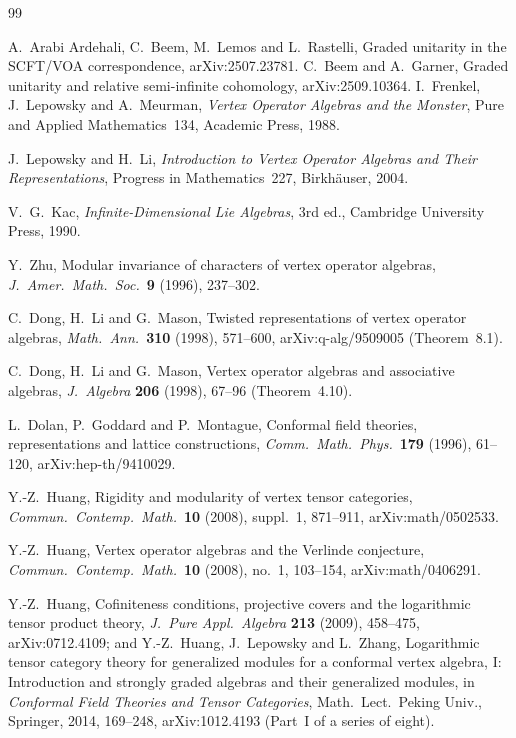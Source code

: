 \documentclass[10pt]{article}
\begin{document}
\begin{thebibliography}{99}\footnotesize

  A.~Arabi Ardehali, C.~Beem, M.~Lemos and L.~Rastelli, Graded unitarity in the SCFT/VOA correspondence,
  arXiv:2507.23781.
  C.~Beem and A.~Garner, Graded unitarity and relative semi-infinite cohomology, arXiv:2509.10364.
  I.~Frenkel, J.~Lepowsky and A.~Meurman, \emph{Vertex Operator Algebras and the Monster}, Pure and Applied
  Mathematics~134, Academic Press, 1988.

  J.~Lepowsky and H.~Li, \emph{Introduction to Vertex Operator Algebras and Their Representations}, Progress in
  Mathematics~227, Birkh\"auser, 2004.

  V.~G.~Kac, \emph{Infinite-Dimensional Lie Algebras}, 3rd ed., Cambridge University Press, 1990.

  Y.~Zhu, Modular invariance of characters of vertex operator algebras, \emph{J.\ Amer.\ Math.\ Soc.}\ \textbf{9}
  (1996), 237--302.

  C.~Dong, H.~Li and G.~Mason, Twisted representations of vertex operator algebras, \emph{Math.\ Ann.}\ \textbf{310}
  (1998), 571--600, arXiv:q-alg/9509005 (Theorem~8.1).

  C.~Dong, H.~Li and G.~Mason, Vertex operator algebras and associative algebras, \emph{J.\ Algebra} \textbf{206}
  (1998), 67--96 (Theorem~4.10).

  L.~Dolan, P.~Goddard and P.~Montague, Conformal field theories, representations and lattice constructions,
  \emph{Comm.\ Math.\ Phys.}\ \textbf{179} (1996), 61--120, arXiv:hep-th/9410029.

  Y.-Z.~Huang, Rigidity and modularity of vertex tensor categories, \emph{Commun.\ Contemp.\ Math.}\ \textbf{10}
  (2008), suppl.~1, 871--911, arXiv:math/0502533.

  Y.-Z.~Huang, Vertex operator algebras and the Verlinde conjecture, \emph{Commun.\ Contemp.\ Math.}\ \textbf{10}
  (2008), no.~1, 103--154, arXiv:math/0406291.

  Y.-Z.~Huang, Cofiniteness conditions, projective covers and the logarithmic tensor product theory, \emph{J.\ Pure
  Appl.\ Algebra} \textbf{213} (2009), 458--475, arXiv:0712.4109; and Y.-Z.~Huang, J.~Lepowsky and L.~Zhang,
  Logarithmic tensor category theory for generalized modules for a conformal vertex algebra, I: Introduction and
  strongly graded algebras and their generalized modules, in \emph{Conformal Field Theories and Tensor Categories},
  Math.\ Lect.\ Peking Univ., Springer, 2014, 169--248, arXiv:1012.4193 (Part~I of a series of eight).


\end{thebibliography}
\end{document}
